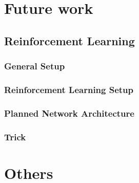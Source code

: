 \documentclass{beamer}
\begin{document}
	\begin{frame}
	\end{frame}
	
	\section{Future work}
	\subsection{Reinforcement Learning}
	\subsubsection{General Setup}
	\begin{frame}
		\frametitle{Reinforcement Learning Setup}
		
	\end{frame}
	\subsubsection{Planned Network Architecture}
	\subsubsection{Trick}
	
	\section{Others}
\end{document}
